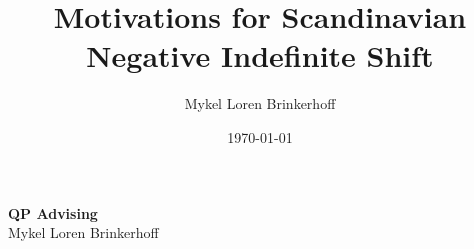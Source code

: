\documentclass[12pt, letterpaper]{article}
\title{Motivations for Scandinavian Negative Indefinite Shift}
\author{Mykel Loren Brinkerhoff}
\date{\today}
\begin{document}
	
	
	
\begin{center}
	{\Large \textbf{QP Advising}}\\
	\vspace{6pt}
	Mykel Loren Brinkerhoff\\
\end{center}
\thispagestyle{fancy}

\tableofcontents


\end{document}
